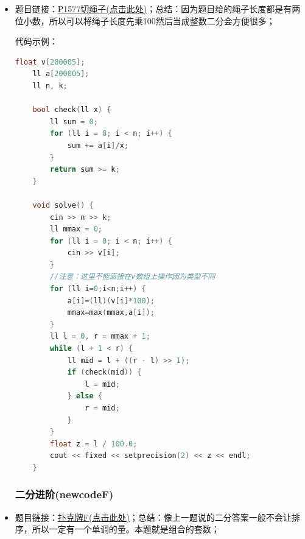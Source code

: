 \begin{itemize}
代码示例：\\
\begin{lstlisting}[language=C++]
ll s[N], d[N], t[N], r[N], b[N];
ll n, m;

bool check(ll x) {
	for (ll i = 1; i <= n; i++)b[i] = r[i];
	for (ll i = 1; i <= x; i++) {
		b[s[i]] -= d[i];
		b[t[i] + 1] += d[i];
	}
	ll sum = 0;
	for (ll i = 1; i <= n; i++) {
		sum += b[i];
		if (sum < 0) {
			return true;
		}
	}
	return false;
}

void solve() {
	cin >> n >> m;
	for (ll i = 1; i <= n; i++) {
		cin >> r[i];
	}
	//这里需要特别注意：在数组本身进行差分是一定要倒序差分，不然会
	//影响下一项，也可以重新开一个数组来存放差分，就不需要倒序。
	for (ll i = n; i >= 1; i--) {
		r[i] -= r[i - 1];
	}
	for (ll i = 1; i <= m; i++) {
		cin >> d[i] >> s[i] >> t[i];
	}
	ll l = 0, right = m + 1;
	while (l + 1 < right) {
		ll mid = l + ((right - l) >> 1);
		if (check(mid)) {
			right = mid;
		} else {
			l = mid;
		}
	}
	if (check(right)) {
		cout << -1 << endl;
		cout << right << endl;
	} else {
		cout << 0 << endl;
	}
}
\end{lstlisting}
\textcolor{red}{再次强调：在数组本身做差分时一定要倒序！！！}
\subsubsection{P1577切绳子}
\item 题目链接：\href{https://www.luogu.com.cn/problem/P1577}{P1577切绳子(点击此处)}；总结：因为题目给的绳子长度都是有两位小数，所以可以将绳子长度先乘100然后当成整数二分会方便很多；

代码示例：\\
\begin{lstlisting}[language=C++]
	float v[200005];
	ll a[200005];
	ll n, k;
	
	bool check(ll x) {
		ll sum = 0;
		for (ll i = 0; i < n; i++) {
			sum += a[i]/x;
		}
		return sum >= k;
	}
	
	void solve() {
		cin >> n >> k;
		ll mmax = 0;
		for (ll i = 0; i < n; i++) {
			cin >> v[i];
		}
		//注意：这里不能直接在v数组上操作因为类型不同
		for (ll i=0;i<n;i++) {
			a[i]=(ll)(v[i]*100);
			mmax=max(mmax,a[i]);
		}
		ll l = 0, r = mmax + 1;
		while (l + 1 < r) {
			ll mid = l + ((r - l) >> 1);
			if (check(mid)) {
				l = mid;
			} else {
				r = mid;
			}
		}
		float z = l / 100.0;
		cout << fixed << setprecision(2) << z << endl;
	}
\end{lstlisting}
\subsubsection{二分进阶(newcodeF)}
\item 题目链接：\href{https://ac.nowcoder.com/acm/contest/126127/F}{扑克牌F(点击此处)}；总结：像上一题说的二分答案一般不会让排序，所以一定有一个单调的量。本题就是组合的套数；


\end{itemize}
